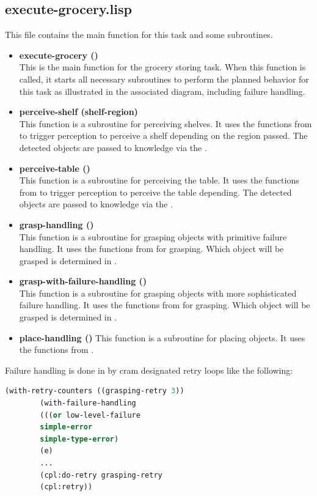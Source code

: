\documentclass[main.tex]{subfiles}
\begin{document}
        \subsection{execute-grocery.lisp}
        \label{execute_grocery_planning_doku}
        This file contains the main function for this task and some subroutines.
        \begin{itemize}
            \item \textbf{execute-grocery ()} \\
            This is the main function for the grocery storing task. When this function is called, it starts all necessary subroutines to perform the planned behavior for this task as illustrated in the associated diagram, including failure handling.
            \item \textbf{perceive-shelf (shelf-region)} \\
            This function is a subroutine for perceiving shelves. It uses the functions from  to trigger perception to perceive a shelf depending on the region passed. The detected objects are passed to knowledge via the .
            \item \textbf{perceive-table ()} \\
            This function is a subroutine for perceiving the table. It uses the functions from  to trigger perception to perceive the table depending. The detected objects are passed to knowledge via the .
            \item \textbf{grasp-handling ()} \\
            This function is a subroutine for grasping objects with primitive failure handling. It uses the functions from  for grasping. Which object will be grasped is determined in .
            \item \textbf{grasp-with-failure-handling ()} \\
            This function is a subroutine for grasping objects with more sophisticated failure handling. It uses the functions from  for grasping. Which object will be grasped is determined in .
            \item \textbf{place-handling ()}
            This function is a subroutine for placing objects. It uses the functions from .
        \end{itemize}
        Failure handling is done in by cram designated retry loops like the following:
        \begin{lstlisting}[language=lisp]
        (with-retry-counters ((grasping-retry 3))
        (with-failure-handling
        (((or low-level-failure 
        simple-error
        simple-type-error)
        (e)
        ...
        (cpl:do-retry grasping-retry
        (cpl:retry))
        \end{lstlisting}
        
\end{document}
